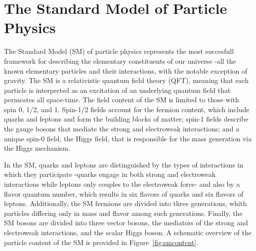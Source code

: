 
\chapter{The Standard Model of Particle Physics}
\label{chap:theory}

The Standard Model (SM) of particle physics represents the most succesfull framework for describing the elementary constituents of our universe -all the known elementary particles and their interactions, with the notable exception of gravity. The SM is a relativistic quantum field theory (QFT), meaning that each particle is interpreted as an excitation of an underlying quantum field that permeates all space-time. The field content of the SM is limited to those with spin 0, 1/2, and 1. Spin-1/2 fields account for the fermion content, which include quarks and leptons and form the building blocks of matter; spin-1 fields describe the gauge bosons that mediate the strong and electroweak interactions; and a unique spin-0 field, the Higgs field, that is responsible for the mass generation via the Higgs mechanism. 

In the SM, quarks and leptons are distinguished by the types of interactions in which they participate -quarks engage in both strong and electroweak interactions while leptons only couples to the electroweak force- and also by a flavor quantum number, which results in six flavors of quarks and six flavors of leptons. Additionally, the SM fermions are divided into three generations, whith particles differing only in mass and flavor among such generations. Finally, the SM bosons are divided into three vector bosons, the mediators of the strong and electroweak interactions, and the scalar Higgs boson. A schematic overview of the particle content of the SM is provided in Figure~\ref{fig:smcontent}.

